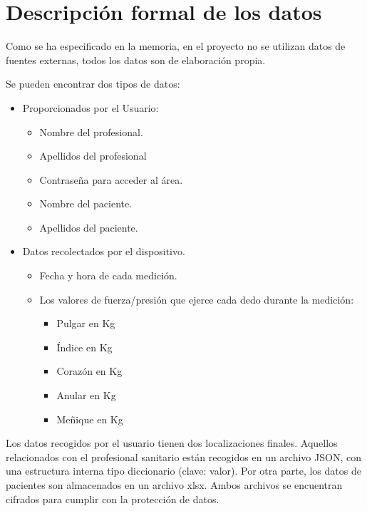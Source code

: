 \section{Descripción formal de los datos}

Como se ha especificado en la memoria, en el proyecto no se utilizan datos de fuentes externas, todos los datos son de elaboración propia.

Se pueden encontrar dos tipos de datos:
\begin{itemize}
    \item Proporcionados por el Usuario:
    \begin{itemize}
        \item Nombre del profesional. 
        \item Apellidos del profesional
        \item Contraseña para acceder al área.
        \item Nombre del paciente.
        \item Apellidos del paciente.
    \end{itemize}
        \item Datos recolectados por el dispositivo.
        \begin{itemize}
            \item Fecha y hora de cada medición.
            \item Los valores de fuerza/presión que ejerce cada dedo durante la medición:
            \begin{itemize}
                \item Pulgar en Kg
                \item Índice en Kg
                \item Corazón en Kg
                \item Anular en Kg
                \item Meñique en Kg
            \end{itemize}
        \end{itemize}
\end{itemize}

Los datos recogidos por el usuario tienen dos localizaciones finales. Aquellos relacionados con el profesional sanitario están recogidos en un archivo JSON, con una estructura interna tipo diccionario (clave: valor). Por otra parte, los datos de pacientes son almacenados en un archivo xlsx. Ambos archivos se encuentran cifrados para cumplir con la protección de datos.

